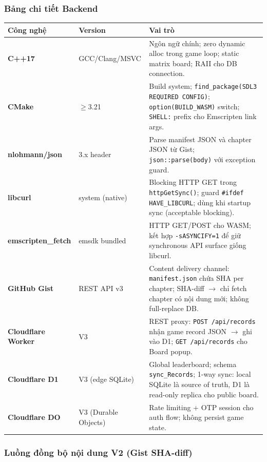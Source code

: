 \documentclass[12pt,a4paper]{article}
\begin{document}
\subsubsection{Bảng chi tiết Backend}

\begin{tabularx}{\linewidth}{|l|l|X|}
  \hline
  \textbf{Công nghệ} & \textbf{Version} & \textbf{Vai trò} \\
  \hline
  \textbf{C++17}           & GCC/Clang/MSVC & Ngôn ngữ chính; zero dynamic alloc trong game loop; static matrix board; RAII cho DB connection. \\
  \hline
  \textbf{CMake}           & $\geq$3.21     & Build system; \texttt{find\_package(SDL3 REQUIRED CONFIG)}; \texttt{option(BUILD\_WASM)} switch; \texttt{SHELL:} prefix cho Emscripten link args. \\
  \hline
  \textbf{nlohmann/json}   & 3.x header     & Parse manifest JSON và chapter JSON từ Gist; \texttt{json::parse(body)} với exception guard. \\
  \hline
  \textbf{libcurl}         & system (native)& Blocking HTTP GET trong \texttt{httpGetSync()}; guard \texttt{\#ifdef HAVE\_LIBCURL}; dùng khi startup sync (acceptable blocking). \\
  \hline
  \textbf{emscripten\_fetch}& emsdk bundled & HTTP GET/POST cho WASM; kết hợp \texttt{-sASYNCIFY=1} để giữ synchronous API surface giống libcurl. \\
  \hline
  \textbf{GitHub Gist}     & REST API v3    & Content delivery channel: \texttt{manifest.json} chứa SHA per chapter; SHA-diff $\rightarrow$ chỉ fetch chapter có nội dung mới; không full-replace DB. \\
  \hline
  \textbf{Cloudflare Worker}& V3            & REST proxy: \texttt{POST /api/records} nhận game record JSON $\rightarrow$ ghi vào D1; \texttt{GET /api/records} cho Board popup. \\
  \hline
  \textbf{Cloudflare D1}   & V3 (edge SQLite)& Global leaderboard; schema \texttt{sync\_Records}; 1-way sync: local SQLite là source of truth, D1 là read-only replica cho public board. \\
  \hline
  \textbf{Cloudflare DO}   & V3 (Durable Objects)& Rate limiting + OTP session cho auth flow; không persist game state. \\
  \hline
\end{tabularx}

\subsubsection{Luồng đồng bộ nội dung V2 (Gist SHA-diff)}
\end{document}
